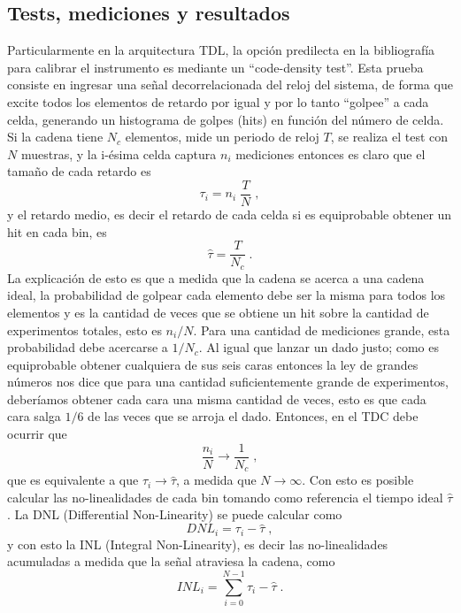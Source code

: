 \subsection{Tests, mediciones y resultados}
Particularmente en la arquitectura TDL, la opción predilecta en la bibliografía para calibrar el instrumento es mediante 
un ``code-density test''. Esta prueba consiste en ingresar una señal decorrelacionada del reloj del sistema, de forma que 
excite todos los elementos de retardo por igual y por lo tanto ``golpee'' a cada celda, generando un
histograma de golpes (hits) en función del número de celda. Si la cadena tiene
$N_c$ elementos, mide un periodo de reloj $T$, se realiza el test con $N$ muestras,
y la i-ésima celda captura $n_i$ mediciones entonces es claro que el 
tamaño de cada retardo es
\begin{equation}
     \tau_i = n_i \; \dfrac{T}{N} \; ,
     \label{eq: tau_i}
\end{equation}
y el retardo medio, es decir el retardo de cada celda si es equiprobable obtener un hit 
en cada bin, es
\begin{equation}
     \hat{\tau} = \dfrac{T}{N_c} \; .
     \label{eq: tau_medio}
\end{equation}
La explicación de esto es que a medida que la cadena se acerca a una cadena ideal, la probabilidad de golpear cada
elemento debe ser la misma para todos los elementos y es la cantidad de veces que se obtiene un hit
sobre la cantidad de experimentos totales, esto es $n_i/N$. Para una cantidad de mediciones grande,
esta probabilidad debe acercarse a $1/N_c$. Al igual que lanzar un dado justo; como es
equiprobable obtener cualquiera de sus seis caras entonces la ley de grandes números nos dice
que para una cantidad suficientemente grande de experimentos, deberíamos obtener cada cara una misma cantidad
de veces, esto es que cada cara salga $1/6$ de las veces que se arroja el dado.
Entonces, en el TDC debe ocurrir que 
\begin{equation*}
     \dfrac{n_i}{N} \longrightarrow \dfrac{1}{N_c} \; ,
\end{equation*}
que es equivalente a que $\tau_i \longrightarrow \hat{\tau}$, a medida que $N \rightarrow \infty$.
Con esto es posible calcular las no-linealidades de cada bin tomando como referencia
el tiempo ideal $\hat{\tau}$. La DNL (Differential Non-Linearity) 
se puede calcular como
\begin{equation}
     DNL_i = \tau_i - \hat{\tau} \; ,
     \label{eq: DNL}
\end{equation}
y con esto la INL (Integral Non-Linearity), es decir las no-linealidades acumuladas a medida que la 
señal atraviesa la cadena, como
\begin{equation}
     INL_i = \sum_{i=0}^{N-1} {\tau_i - \hat{\tau}} \; .
     \label{eq: INL}
\end{equation}

